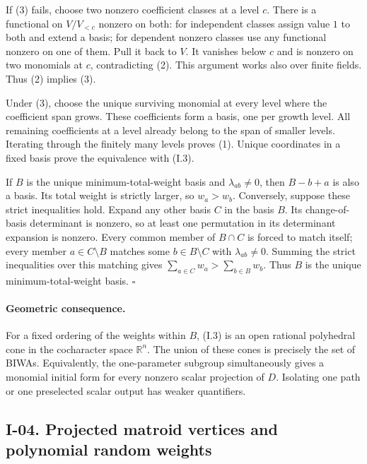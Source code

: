If (3) fails, choose two nonzero coefficient classes at a level $c$.
There is a functional on $V/V_{<c}$ nonzero on both: for independent
classes assign value $1$ to both and extend a basis; for dependent
nonzero classes use any functional nonzero on one of them.  Pull it
back to $V$.  It vanishes below $c$ and is nonzero on two monomials
at $c$, contradicting (2).  This argument works also over finite
fields.  Thus (2) implies (3).

Under (3), choose the unique surviving monomial at every level where
the coefficient span grows.  These coefficients form a basis, one
per growth level.  All remaining coefficients at a level already
belong to the span of smaller levels.  Iterating through the finitely
many levels proves (1).  Unique coordinates in a fixed basis prove
the equivalence with (I.3).

If $B$ is the unique minimum-total-weight basis and
$\lambda_{ab}\ne0$, then $B-b+a$ is also a basis.  Its total weight
is strictly larger, so $w_a>w_b$.  Conversely, suppose these strict
inequalities hold.  Expand any other basis $C$ in the basis $B$.
Its change-of-basis determinant is nonzero, so at least one
permutation in its determinant expansion is nonzero.  Every common
member of $B\cap C$ is forced to match itself; every member
$a\in C\setminus B$ matches some $b\in B\setminus C$ with
$\lambda_{ab}\ne0$.  Summing the strict inequalities over this
matching gives $\sum_{a\in C}w_a>\sum_{b\in B}w_b$.
Thus $B$ is the unique minimum-total-weight basis. \hfill$\square$

\paragraph{Geometric consequence.}
For a fixed ordering of the weights within $B$, (I.3) is an open
rational polyhedral cone in the cocharacter space $\mathbb R^n$.
The union of these cones is precisely the set of BIWAs.  Equivalently,
the one-parameter subgroup simultaneously gives a monomial initial
form for every nonzero scalar projection of $D$.  Isolating one path
or one preselected scalar output has weaker quantifiers.

\subsection{I-04. Projected matroid vertices and polynomial random weights}
\label{I-04}

